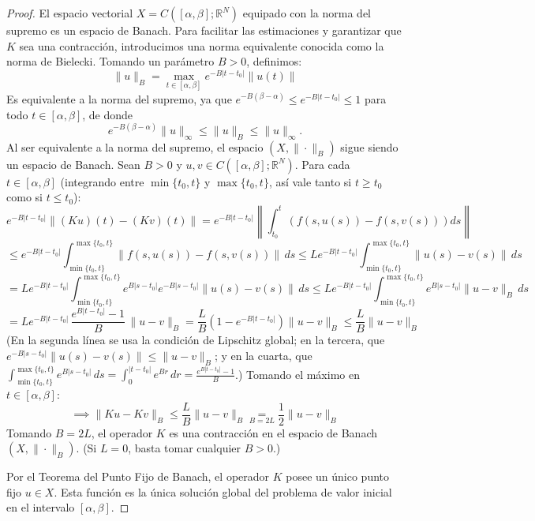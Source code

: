\begin{proof}
    El espacio vectorial $X = C([\alpha, \beta]; \mathbb{R}^N)$ equipado con la norma del supremo es un espacio de Banach. Para facilitar las estimaciones y garantizar que $K$ sea una contracción, introducimos una norma equivalente conocida como la norma de Bielecki. Tomando un parámetro $B > 0$, definimos:
    \[
        \| u \|_B = \max_{t \in [\alpha, \beta]} e^{-B |t - t_0|} \| u(t) \|
    \]
    Es equivalente a la norma del supremo, ya que $e^{-B(\beta - \alpha)} \leq e^{-B|t - t_0|} \leq 1$ para todo $t \in [\alpha, \beta]$, de donde
    \[
        e^{-B(\beta - \alpha)} \| u \|_\infty \leq \| u \|_B \leq \| u \|_\infty.
    \]
    Al ser equivalente a la norma del supremo, el espacio $(X, \| \cdot \|_B)$ sigue siendo un espacio de Banach. Sean $B > 0$ y $u, v \in C([\alpha, \beta]; \mathbb{R}^N)$. Para cada $t \in [\alpha, \beta]$ (integrando entre $\min\{t_0, t\}$ y $\max\{t_0, t\}$, así vale tanto si $t \geq t_0$ como si $t \leq t_0$):
    \[
        e^{-B|t - t_0|} \| (Ku)(t) - (Kv)(t) \| = e^{-B|t - t_0|} \left\| \int_{t_0}^t \left( f(s, u(s)) - f(s, v(s)) \right) ds \right\|
    \]
    \[
        \leq e^{-B|t - t_0|} \int_{\min\{t_0, t\}}^{\max\{t_0, t\}} \| f(s, u(s)) - f(s, v(s)) \| \, ds
        \leq L e^{-B|t - t_0|} \int_{\min\{t_0, t\}}^{\max\{t_0, t\}} \| u(s) - v(s) \| \, ds
    \]
    \[
        = L e^{-B|t - t_0|} \int_{\min\{t_0, t\}}^{\max\{t_0, t\}} e^{B|s - t_0|} e^{-B|s - t_0|} \| u(s) - v(s) \| \, ds
        \leq L e^{-B|t - t_0|} \int_{\min\{t_0, t\}}^{\max\{t_0, t\}} e^{B|s - t_0|} \| u - v \|_B \, ds
    \]
    \[
        = L e^{-B|t - t_0|} \, \frac{e^{B|t - t_0|} - 1}{B} \, \| u - v \|_B
        = \frac{L}{B} \left( 1 - e^{-B|t - t_0|} \right) \| u - v \|_B
        \leq \frac{L}{B} \| u - v \|_B
    \]
    (En la segunda línea se usa la condición de Lipschitz global; en la tercera, que $e^{-B|s - t_0|} \| u(s) - v(s) \| \leq \| u - v \|_B$; y en la cuarta, que $\int_{\min\{t_0, t\}}^{\max\{t_0, t\}} e^{B|s - t_0|} \, ds = \int_0^{|t - t_0|} e^{Br} \, dr = \frac{e^{B|t - t_0|} - 1}{B}$.) Tomando el máximo en $t \in [\alpha, \beta]$:
    \[
        \implies \| Ku - Kv \|_B \leq \frac{L}{B} \| u - v \|_B \underset{B = 2L}{=} \frac{1}{2} \| u - v \|_B
    \]
    Tomando $B = 2L$, el operador $K$ es una contracción en el espacio de Banach $(X, \| \cdot \|_B)$. (Si $L = 0$, basta tomar cualquier $B > 0$.)
    
    Por el Teorema del Punto Fijo de Banach, el operador $K$ posee un único punto fijo $u \in X$. Esta función es la única solución global del problema de valor inicial en el intervalo $[\alpha, \beta]$.
\end{proof}

